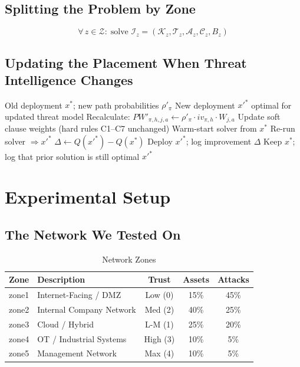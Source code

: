 \documentclass[journal]{IEEEtran}
\newcommand{\calK}{\mathcal{K}}
\newcommand{\calT}{\mathcal{T}}
\newcommand{\calA}{\mathcal{A}}
\newcommand{\calZ}{\mathcal{Z}}
\newcommand{\calC}{\mathcal{C}}
\begin{document}
\subsection{Splitting the Problem by Zone}

\begin{equation}
  \forall\, z \in \calZ:\;
  \text{solve } \mathcal{I}_z = (\calK_z, \calT_z, \calA_z,
  \calC_z, B_z)
\end{equation}

\subsection{Updating the Placement When Threat Intelligence
            Changes}

\begin{algorithm}[htbp]
\caption{Adaptive Redeployment When Threat Priors Change}
\label{alg:redeploy}
\begin{algorithmic}[1]
\REQUIRE Old deployment $x^*$;
         new path probabilities $\rho'_\pi$
\ENSURE  New deployment $x'^*$ optimal for updated threat model
\STATE Recalculate:
  $PW'_{\pi,h,j,a} \leftarrow
   \rho'_\pi \cdot iv_{\pi,h} \cdot W_{j,a}$
\STATE Update soft clause weights (hard rules C1--C7 unchanged)
\STATE Warm-start solver from $x^*$
\STATE Re-run solver $\Rightarrow x'^*$
\STATE $\Delta \leftarrow Q(x'^*) - Q(x^*)$
  \STATE Deploy $x'^*$; log improvement $\Delta$
\ELSE
  \STATE Keep $x^*$; log that prior solution is still optimal
\ENDIF
\RETURN $x'^*$
\end{algorithmic}
\end{algorithm}

\section{Experimental Setup}
\label{sec:methodology}

\subsection{The Network We Tested On}

\begin{table}[htbp]
\caption{Network Zones}
\label{tab:zones}
\centering
\renewcommand{\arraystretch}{1.2}
\begin{tabular}{@{}llccc@{}}
\toprule
\textbf{Zone} & \textbf{Description} &
\textbf{Trust} & \textbf{Assets} & \textbf{Attacks} \\
\midrule
zone1 & Internet-Facing / DMZ    & Low (0)  & 15\% & 45\% \\
zone2 & Internal Company Network & Med (2)  & 40\% & 25\% \\
zone3 & Cloud / Hybrid           & L-M (1)  & 25\% & 20\% \\
zone4 & OT / Industrial Systems  & High (3) & 10\% &  5\% \\
zone5 & Management Network       & Max (4)  & 10\% &  5\% \\
\bottomrule
\end{tabular}
\end{table}
\end{document}
